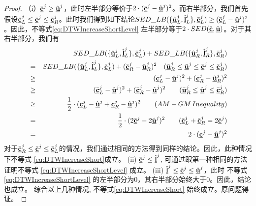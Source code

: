 \begin{proof}
	（i）$\bar{\emph{{\textbf{c}}}}^{j} \ge \hat{\emph{{\textbf{u}}}}^{j}$，此时左半部分等价于$2 \cdot (\bar{\emph{{\textbf{c}}}}^{j} - \hat{\emph{{\textbf{u}}}}^{j})^2$。而右半部分，我们首先假设$\bar{\emph{{\textbf{c}}}}_{L}^{j} \le \bar{\emph{{\textbf{c}}}}^{j} \le \bar{\emph{{\textbf{c}}}}_{R}^{j}$。此时我们得到如下结论$SED\_LB(\{ \hat{\emph{{\textbf{u}}}}_{L}^{j}, \hat{\emph{{\textbf{l}}}}_{L}^{j} \}, \bar{\emph{{\textbf{c}}}}_{L}^{j})  \ge (\bar{\emph{{\textbf{c}}}}_{L}^{j} - \hat{\emph{{\textbf{u}}}}^{j})^2$。因此，不等式\ref{eq:DTWIncreaseShortLevel} 左半部分等于$2 \cdot SED(\bar{\emph{{\textbf{c}}}} , \hat{\emph{{\textbf{u}}}})$。对于其右半部分，我们有
	\allowdisplaybreaks
	\begin{eqnarray}
	&&SED\_LB(\{ \hat{\emph{{\textbf{u}}}}_{L}^{j}, \hat{\emph{{\textbf{l}}}}_{L}^{j} \}, \bar{\emph{{\textbf{c}}}}_{L}^{j}) + SED\_LB(\{ \hat{\emph{{\textbf{u}}}}_{R}^{j}, \hat{\emph{{\textbf{l}}}}_{R}^{j} \}, \bar{\emph{{\textbf{c}}}}_{R}^{j})  \nonumber \\
	&=&SED\_LB(\{ \hat{\emph{{\textbf{u}}}}_{L}^{j}, \hat{\emph{{\textbf{l}}}}_{L}^{j} \}, \bar{\emph{{\textbf{c}}}}_{L}^{j}) + (\bar{\emph{{\textbf{c}}}}_{R}^{j}- \hat{\emph{{\textbf{u}}}}_{R}^{j})^2 \quad ( \hat{\emph{{\textbf{u}}}}_{R}^{j} \le \hat{\emph{{\textbf{u}}}}^{j} \le  \bar{\emph{{\textbf{c}}}}^{j} \le  \bar{\emph{{\textbf{c}}}}_{R}^{j}) \nonumber \\
	&\ge&(\bar{\emph{{\textbf{c}}}}_{L}^{j} - \hat{\emph{{\textbf{u}}}}^{j})^2 +  (\bar{\emph{{\textbf{c}}}}_{R}^{j}- \hat{\emph{{\textbf{u}}}}_{R}^{j})^2 \nonumber \\
	&\ge&(\bar{\emph{{\textbf{c}}}}_{L}^{j} - \hat{\emph{{\textbf{u}}}}^{j})^2 +  (\bar{\emph{{\textbf{c}}}}_{R}^{j}- \hat{\emph{{\textbf{u}}}}^{j})^2 \qquad (\bar{\emph{{\textbf{u}}}}_{R}^{j} \le \hat{\emph{{\textbf{u}}}}^{j} \le \bar{\emph{{\textbf{c}}}}_{R}^{j}) \nonumber \\
	&\ge&\frac{1}{2}\cdot (\bar{\emph{{\textbf{c}}}}_{L}^{j} - \hat{\emph{{\textbf{u}}}}^{j}  + \bar{\emph{{\textbf{c}}}}_{R}^{j} - \hat{\emph{{\textbf{u}}}}^{j})^2 \nonumber \qquad (AM-GM\, Inequality) \\
	&=&\frac{1}{2}\cdot (2 \bar{\emph{{\textbf{c}}}}^{j} - 2\hat{\emph{{\textbf{u}}}}^{j})^2  \qquad (\bar{\emph{{\textbf{c}}}}_{L}^{j} + \bar{\emph{{\textbf{c}}}}_{R}^{j} = 2\bar{\emph{{\textbf{c}}}}^{j}) \nonumber  \nonumber \\
	&=& 2\cdot  (\bar{\emph{{\textbf{c}}}}^{j} - \hat{\emph{{\textbf{u}}}}^{j})^2 \nonumber
	\end{eqnarray}
	\allowdisplaybreaks[4]
对于$\bar{\emph{{\textbf{c}}}}_{R}^{j} \le \bar{\emph{{\textbf{c}}}}^{j} \le \bar{\emph{{\textbf{c}}}}_{L}^{j}$的情况，我们通过相同的方法得到同样的结论。因此，此种情况下不等式 \ref{eq:DTWIncreaseShort}成立。
	(ii)  $\bar{\emph{{\textbf{c}}}}^{j} \le \hat{\emph{{\textbf{l}}}}^{j}$, 可通过跟第一种相同的方法证明不等式 \ref{eq:DTWIncreaseShortLevel} 成立。
	(iii)  $\hat{\emph{{\textbf{l}}}}^{j} \le \bar{\emph{{\textbf{c}}}}^{j} \le \hat{\emph{{\textbf{u}}}}^{j}$，此时 不等式\ref{eq:DTWIncreaseShortLevel} 的左半部分为0，其右半部分始终大于0。因此，结论也成立。
	综合以上几种情况, 不等式\ref{eq:DTWIncreaseShort} 始终成立。原问题得证。
\end{proof}

\clearpage
\phantom{s}
\clearpage